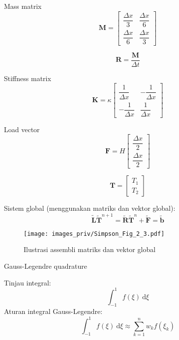 Mass matrix
\begin{equation*}
\mathbf{M} = \begin{bmatrix}
\dfrac{\Delta x}{3} & \dfrac{\Delta x}{6} \\
\dfrac{\Delta x}{6} & \dfrac{\Delta x}{3}
\end{bmatrix}
\end{equation*}

\begin{equation*}
\mathbf{R} = \frac{\mathbf{M}}{\Delta t}
\end{equation*}


Stiffness matrix
\begin{equation*}
\mathbf{K} = \kappa\begin{bmatrix}
\dfrac{1}{\Delta x} & -\dfrac{1}{\Delta x} \\[0.4cm]
-\dfrac{1}{\Delta x} & \dfrac{1}{\Delta x}
\end{bmatrix}
\end{equation*}



Load vector
\begin{equation*}
\mathbf{F} = H\begin{bmatrix}
\dfrac{\Delta x}{2} \\
\dfrac{\Delta x}{2}
\end{bmatrix}
\end{equation*}

$$
\mathbf{T} = \begin{bmatrix}
T_1 \\ T_2
\end{bmatrix}
$$

Sistem global (menggunakan matriks dan vektor global):
\begin{equation*}
\tilde{\mathbf{L}} \tilde{\mathbf{T}}^{n+1} = \tilde{\mathbf{R}}
\tilde{\mathbf{T}}^{n} + \tilde{\mathbf{F}} = \tilde{\mathbf{b}}
\end{equation*}


\begin{figure}[h]
{\centering
\texttt{[image: images\_priv/Simpson\_Fig\_2\_3.pdf]}
\par}
\caption{Ilustrasi assembli matriks dan vektor global}
\end{figure}


Gauss-Legendre quadrature

Tinjau integral:
$$
\int_{-1}^{1} f(\xi)\ \mathrm{d}\xi
$$
Aturan integral Gauss-Legendre:
$$
\int_{-1}^{1} f(\xi)\ \mathrm{d}\xi \approx
\sum_{k=1}^{n} w_{k} f(\xi_{k})
$$

